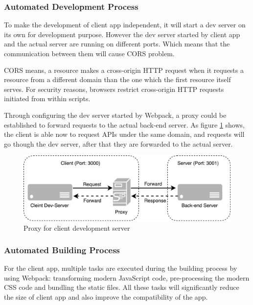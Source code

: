 \subsubsection{Automated Development Process}
To make the development of client app independent, it will start a dev server on its own for development purpose. However the dev server started by client app and the actual server are running on different ports. Which means that the communication between them will cause CORS problem.

CORS means, a resource makes a cross-origin HTTP request when it requests a resource from a different domain than the one which the first resource itself serves. For security reasons, browsers restrict cross-origin HTTP requests initiated from within scripts. \cite{CORS}

Through configuring the dev server started by Webpack, a proxy could be established to forward requests to the actual back-end server. As figure \ref{fig:proxy-server-imp} shows, the client is able now to request APIs under the same domain, and requests will go though the dev server, after that they are forwarded to the actual server.

\begin{figure}[!htbp]
  \centering
    \includegraphics[width=1\textwidth]{Figures/imp-proxy-server.pdf}
  \caption{Proxy for client development server}
  \label{fig:proxy-server-imp}
\end{figure}


\subsubsection{Automated Building Process}

For the client app, multiple tasks are executed during the building process by using Webpack: transforming modern JavaScript code, pre-processing the modern CSS code and bundling the static files. All these tasks will significantly reduce the size of client app and also improve the compatibility of the app.

